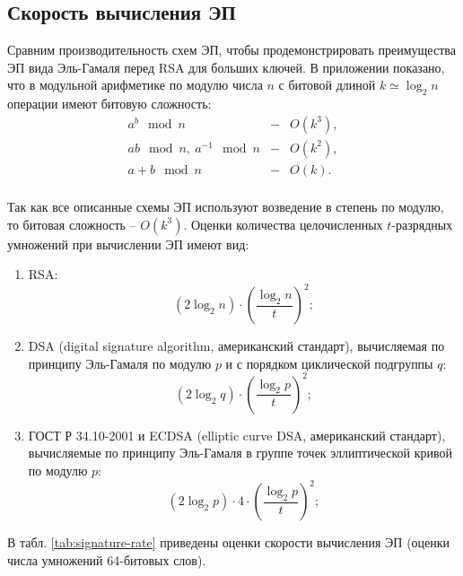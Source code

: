 \subsection*{Скорость вычисления ЭП}

Сравним производительность схем ЭП, чтобы продемонстрировать преимущества ЭП вида Эль-Гамаля перед RSA для больших ключей. В приложении показано, что в модульной арифметике по модулю числа $n$ с битовой длиной $k \simeq \log_2 n$ операции имеют битовую сложность:
\[ \begin{array}{lcl}
    a^b \mod n & - & O(k^3), \\
    ab \mod n, ~ a^{-1} \mod n & - & O(k^2), \\
    a+b \mod n & - & O(k). \\
\end{array} \]

Так как все описанные схемы ЭП используют возведение в степень по модулю, то битовая сложность -- $O(k^3)$. Оценки количества целочисленных $t$-разрядных  умножений при вычислении ЭП имеют вид:
\begin{enumerate}
    \item RSA:
        \[ (2 \log_2 n) \cdot \left( \frac{\log_2 n}{t} \right)^2; \]
    \item DSA (digital signature algorithm, американский стандарт), вычисляемая по принципу Эль-Гамаля по модулю $p$ и с порядком циклической подгруппы $q$:
        \[ (2 \log_2 q) \cdot \left( \frac{\log_2 p}{t} \right)^2; \]
    \item ГОСТ Р 34.10-2001 и ECDSA (elliptic curve DSA, американский стандарт), вычисляемые по принципу Эль-Гамаля в группе точек эллиптической кривой по модулю $p$:
        \[ (2 \log_2 p) \cdot 4 \cdot \left( \frac{\log_2 p}{t} \right)^2; \]
\end{enumerate}
В табл. \ref{tab:signature-rate} приведены оценки скорости вычисления ЭП (оценки числа умножений 64-битовых слов).

